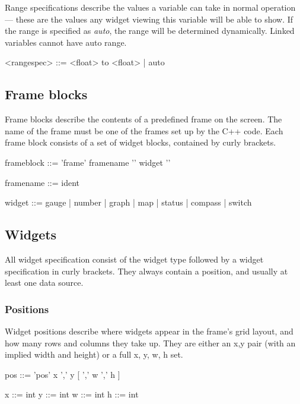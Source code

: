 Range specifications describe the values a variable can take in
normal operation --- these are the values any widget viewing this
variable will be able to show. If the range is specified as \emph{auto},
the range will be determined dynamically. Linked variables cannot
have auto range.
\begin{v}
<rangespec> ::= <float> to <float>
                | auto
\end{v}

\subsection{Frame blocks}
Frame blocks describe the contents of a predefined frame on
the screen. The name of the frame must be one of the frames set
up by the C++ code. Each frame block consists of a set of widget
blocks, contained by curly brackets.
\begin{v}
frameblock  ::= 'frame' framename '{' {widget} '}'

framename   ::= ident

widget      ::= gauge | number | graph | map | status |
                compass | switch
\end{v}
\clearpage
\subsection{Widgets}
All widget specification consist of the widget type followed
by a widget specification in curly brackets. They always
contain a position, and usually at least one data source.

\subsubsection{Positions}
Widget positions describe where widgets appear in the frame's
grid layout, and how many rows and columns they take up. They
are either an x,y pair (with an implied width and height) or a full
x, y, w, h set.
\begin{v}
pos         ::= 'pos' x ',' y [ ',' w ',' h ]

x           ::= int
y           ::= int
w           ::= int
h           ::= int
\end{v}

